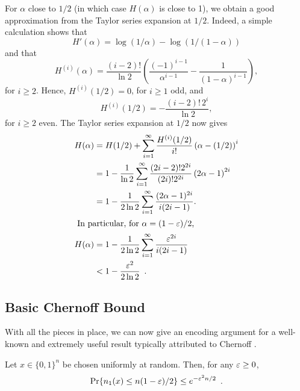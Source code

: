 \documentclass{patmorin}
\begin{document}
For $\alpha$ close to $1/2$ (in which case $H(\alpha)$ is close to 1),
we obtain a good approximation from the Taylor series expansion at
$1/2$.  Indeed, a simple calculation shows that
\[
  H'(\alpha) = \log (1/\alpha) - \log (1/(1-\alpha))
\]
and that
\[
  H^{(i)}(\alpha) = \frac{(i-2)!}{\ln 2} \left( \frac{(-1)^{i-1}}{\alpha^{i-1}} - \frac{1}{(1-\alpha)^{i-1}}\right) ,
\]
for $i \geq 2$. Hence, $H^{(i)}(1/2) = 0$, for $i \geq 1$ odd, and
\[
  H^{(i)}(1/2) = -\frac{(i-2)!\, 2^i}{\ln 2}, 
\]
for $i \geq 2$ even. The Taylor series expansion at $1/2$ now gives
\begin{align}
  H(\alpha) &= 
  H(1/2) + \sum_{i = 1}^{\infty} \frac{H^{(i)}(1/2)}{i!}
     \left(\alpha-(1/2)\right)^i \notag\\
 &= 
1 - \frac{1}{\ln 2}\sum_{i = 1}^{\infty} \frac{(2i-2)! 2^{2i}}{(2i)!2^{2i}}
     \left(2\alpha-1\right)^{2i}\notag\\
&= 1-\frac{1}{2\ln 2}\sum_{i=1}^{\infty}\frac{(2\alpha-1)^{2i}}{i(2i-1)} .
              \notag \\ 
\intertext{ In particular, for $\alpha=(1-\eps)/2$,}
H(\alpha) & = 1-\frac{1}{2\ln 2}\sum_{i=1}^{\infty}\frac{\eps^{2i}}{i(2i-1)} 
              \notag \\ 
            & < 1-\frac{\eps^2}{2\ln 2} \enspace .\eqlabel{entropy-ii}
\end{align}

\subsection{Basic Chernoff Bound}

With all the pieces in place, we can now give an encoding argument for
a well-known and extremely useful result typically attributed to
Chernoff \cite{chernoff:bound}.

\begin{thm}
  Let $x\in\{0,1\}^n$ be chosen uniformly at random. Then, for any
  $\varepsilon \geq 0$,
  \[
    \Pr\{n_1(x) \le n(1-\varepsilon)/2\} \le e^{-\varepsilon^2n/2} \enspace .
  \]
\end{thm}
\end{document}
